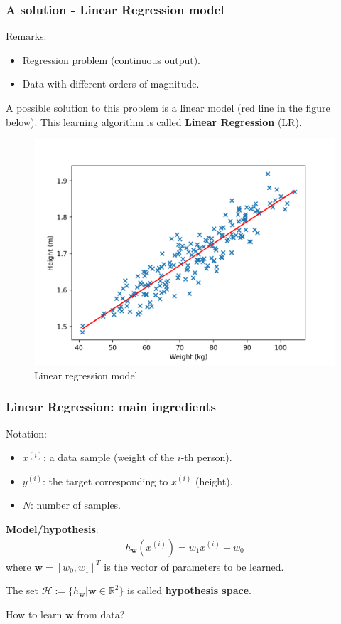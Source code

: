 \documentclass{beamer}
\begin{document}
	\begin{frame}
		\frametitle{A solution - Linear Regression model}
		Remarks:
		\begin{itemize}
			\item Regression problem (continuous output).
			\item Data with different orders of magnitude.
		\end{itemize}
		A possible solution to this problem is a linear model (red line in the figure below). This learning algorithm is called \textbf{Linear Regression} (LR).
		\vspace{-5mm}
		\begin{figure}
			\centering
			\includegraphics[scale=0.4]{images/linear_regression_fit}
			\caption{Linear regression model.}
		\end{figure}
	\end{frame}

	\begin{frame}
		\frametitle{Linear Regression: main ingredients}
		Notation:
		\begin{itemize}
			\item $x^{(i)}$: a data sample (weight of the $i$-th person).
			\item $y^{(i)}$: the target corresponding to $x^{(i)}$ (height).
			\item $N$: number of samples.
		\end{itemize}
	
		\vspace{5 mm}
		
		\textbf{Model/hypothesis}: 
		\begin{align*}
			h_{\bm{w}}(x^{(i)}) = w_1x^{(i)} + w_0
		\end{align*}
		where $\bm{w} = [w_0, w_1]^T$ is the vector of parameters to be learned.
		
		\vspace{5 mm}
		
		The set $\mathcal{H}:= \{h_{\bm{w}}| \bm{w} \in \mathbb{R}^2\}$ is called \textbf{hypothesis space}.
		
		\vspace{5 mm}
		
		How to learn $\bm{w}$ from data?
		
	\end{frame}
\end{document}
